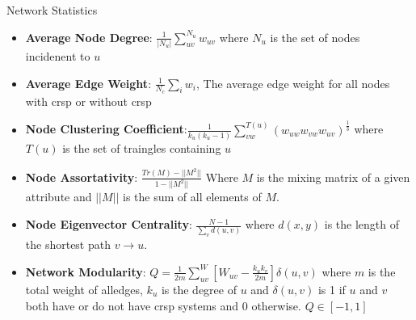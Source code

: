 \documentclass[dvipsnames]{beamer}
\begin{document}
\begin{frame}[fragile]{Network Statistics}
    \begin{itemize}
        \item<2-> \textbf{Average Node Degree}: $\frac{1}{|N_u|}\sum_{uv}^{N_u} w_{uv}$ where $N_u$ is the set of nodes incidenent to $u$
        \item<3-> \textbf{Average Edge Weight}: $\frac{1}{N_c}\sum_i w_i$, The average edge weight for all nodes with \ac{crsp} or without \ac{crsp}
        \item<4-> \textbf{Node Clustering Coefficient}:$\frac{1}{k_u(k_u-1)} \sum_{vw}^{T(u)} (w_{uw} w_{vw} w_{uv})^{\frac{1}{3}}$ where $T(u)$ is the set of traingles containing $u$ \autocite{clustering}
        \item<5-> \textbf{Node Assortativity}: $\frac{Tr(M)-||M^2||}{1-||M^2||}$ Where $M$ is the mixing matrix of a given attribute and $||M||$ is the sum of all elements of $M$.\autocite{newmanmix}
        \item<6-> \textbf{Node Eigenvector Centrality}: $\frac{N-1}{\sum_v d(u,v)}$ where $d(x,y)$ is the length of the shortest path $v \to u$.\autocite{egcen}
        \item<7-> \textbf{Network Modularity}: $Q=\frac{1}{2m}\sum_{uv}^W [W_{uv} - \frac{k_u k_v}{2m}]\delta(u,v)$ where $m$ is the total weight of alledges, $k_u$ is the degree of $u$ and $\delta(u,v)$ is 1 if $u$ and $v$ both have or do not have \ac{crsp} systems and 0 otherwise. $Q \in [-1,1]$ \autocite{modularity}
    \end{itemize}
\end{frame}
\end{document}
